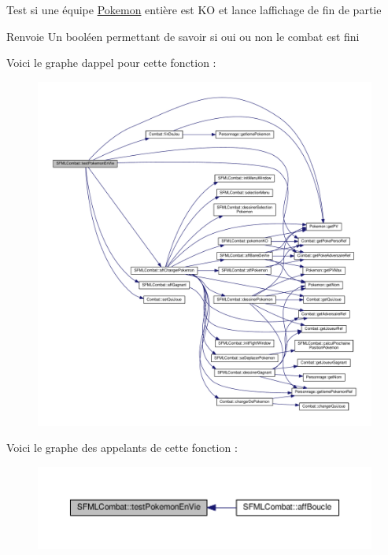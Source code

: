 Test si une équipe \hyperlink{class_pokemon}{Pokemon} entière est KO et lance l\textquotesingle{}affichage de fin de partie \begin{DoxyReturn}{Renvoie}
Un booléen permettant de savoir si oui ou non le combat est fini 
\end{DoxyReturn}
Voici le graphe d\textquotesingle{}appel pour cette fonction \+:\nopagebreak
\begin{figure}[H]
\begin{center}
\leavevmode
\includegraphics[width=350pt]{class_s_f_m_l_combat_af7ddb137c3bbaff70d2c566137c2cbb7_cgraph}
\end{center}
\end{figure}
Voici le graphe des appelants de cette fonction \+:\nopagebreak
\begin{figure}[H]
\begin{center}
\leavevmode
\includegraphics[width=350pt]{class_s_f_m_l_combat_af7ddb137c3bbaff70d2c566137c2cbb7_icgraph}
\end{center}
\end{figure}
\mbox{\label{class_s_f_m_l_combat_a97bf8a2d3300663aacbb8899bbbf3472}} 
